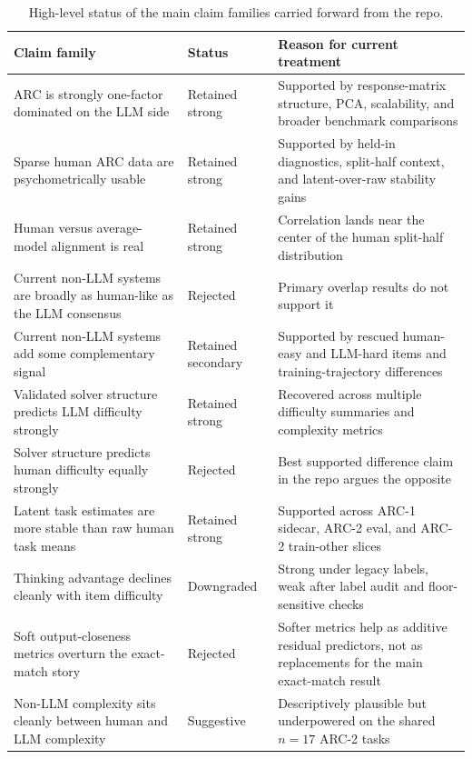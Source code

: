 \documentclass[11pt,letterpaper]{article}
\begin{document}
\begin{table}[t]
\centering
\small
\caption{High-level status of the main claim families carried forward from the repo.}
\begin{tabular}{p{2.0in}p{1.0in}p{2.8in}}
\toprule
\textbf{Claim family} & \textbf{Status} & \textbf{Reason for current treatment} \\
\midrule
ARC is strongly one-factor dominated on the LLM side & Retained strong & Supported by response-matrix structure, PCA, scalability, and broader benchmark comparisons \\
Sparse human ARC data are psychometrically usable & Retained strong & Supported by held-in diagnostics, split-half context, and latent-over-raw stability gains \\
Human versus average-model alignment is real & Retained strong & Correlation lands near the center of the human split-half distribution \\
Current non-LLM systems are broadly as human-like as the LLM consensus & Rejected & Primary overlap results do not support it \\
Current non-LLM systems add some complementary signal & Retained secondary & Supported by rescued human-easy and LLM-hard items and training-trajectory differences \\
Validated solver structure predicts LLM difficulty strongly & Retained strong & Recovered across multiple difficulty summaries and complexity metrics \\
Solver structure predicts human difficulty equally strongly & Rejected & Best supported difference claim in the repo argues the opposite \\
Latent task estimates are more stable than raw human task means & Retained strong & Supported across ARC-1 sidecar, ARC-2 eval, and ARC-2 train-other slices \\
Thinking advantage declines cleanly with item difficulty & Downgraded & Strong under legacy labels, weak after label audit and floor-sensitive checks \\
Soft output-closeness metrics overturn the exact-match story & Rejected & Softer metrics help as additive residual predictors, not as replacements for the main exact-match result \\
Non-LLM complexity sits cleanly between human and LLM complexity & Suggestive & Descriptively plausible but underpowered on the shared $n = 17$ ARC-2 tasks \\
\bottomrule
\end{tabular}
\end{table}
\end{document}

